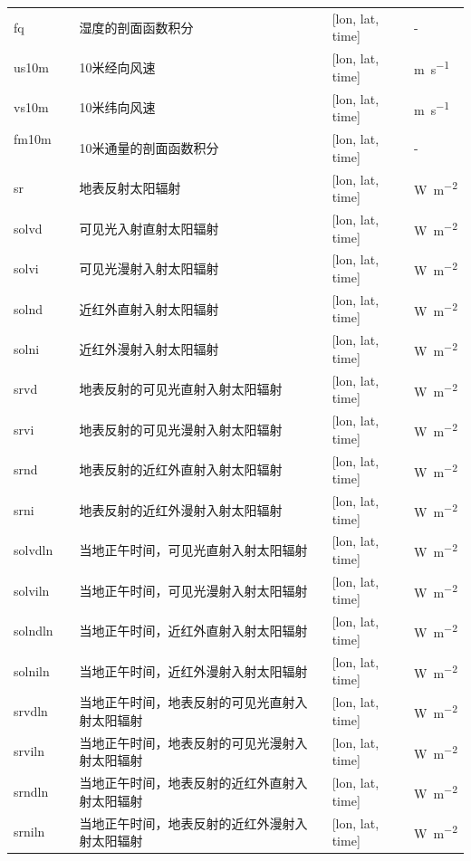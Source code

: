\documentclass[a4paper,12pt,twoside]{article}
\begin{document}
{\begin{longtable}[htbp]{lp{}p{}l}
fq ~ ~ ~ & 湿度的剖面函数积分 & {[}lon, lat, time{]}  & - \\
us10m~ ~ & 10米经向风速 & {[}lon, lat, time{]}  & \unit{m.s^{-1}} \\
vs10m~ ~ & 10米纬向风速 & {[}lon, lat, time{]}  & \unit{m.s^{-1}} \\
fm10m~ ~ & 10米通量的剖面函数积分 & {[}lon, lat, time{]}  & - \\
sr ~ ~ ~ & 地表反射太阳辐射 & {[}lon, lat, time{]}  & \unit{W.m^{-2}} \\
solvd~ ~ & 可见光入射直射太阳辐射 & {[}lon, lat, time{]}  & \unit{W.m^{-2}} \\
solvi~ ~ & 可见光漫射入射太阳辐射 & {[}lon, lat, time{]}  & \unit{W.m^{-2}} \\
solnd~ ~ & 近红外直射入射太阳辐射 & {[}lon, lat, time{]}  & \unit{W.m^{-2}} \\
solni~ ~ & 近红外漫射入射太阳辐射 & {[}lon, lat, time{]}  & \unit{W.m^{-2}} \\
srvd ~ ~ & 地表反射的可见光直射入射太阳辐射 & {[}lon, lat, time{]}  & \unit{W.m^{-2}} \\
srvi ~ ~ & 地表反射的可见光漫射入射太阳辐射 & {[}lon, lat, time{]}  & \unit{W.m^{-2}} \\
srnd ~ & 地表反射的近红外直射入射太阳辐射 & {[}lon, lat, time{]}  & \unit{W.m^{-2}} \\
srni ~ & 地表反射的近红外漫射入射太阳辐射 & {[}lon, lat, time{]}  & \unit{W.m^{-2}} \\
solvdln~ & 当地正午时间，可见光直射入射太阳辐射 & {[}lon, lat,
time{]}  & \unit{W.m^{-2}} \\
solviln~ & 当地正午时间，可见光漫射入射太阳辐射 & {[}lon, lat,
time{]}  & \unit{W.m^{-2}} \\
solndln~ & 当地正午时间，近红外直射入射太阳辐射 & {[}lon, lat,
time{]}  & \unit{W.m^{-2}} \\
solniln~ & 当地正午时间，近红外漫射入射太阳辐射 & {[}lon, lat,
time{]}  & \unit{W.m^{-2}} \\
srvdln ~ & 当地正午时间，地表反射的可见光直射入射太阳辐射 & {[}lon, lat,
time{]}  & \unit{W.m^{-2}} \\
srviln ~ & 当地正午时间，地表反射的可见光漫射入射太阳辐射 & {[}lon, lat,
time{]}  & \unit{W.m^{-2}} \\
srndln ~ & 当地正午时间，地表反射的近红外直射入射太阳辐射 & {[}lon, lat,
time{]}  & \unit{W.m^{-2}} \\
srniln~ & 当地正午时间，地表反射的近红外漫射入射太阳辐射 & {[}lon, lat,
time{]}  & \unit{W.m^{-2}} \\


\end{longtable}}
\end{document}
